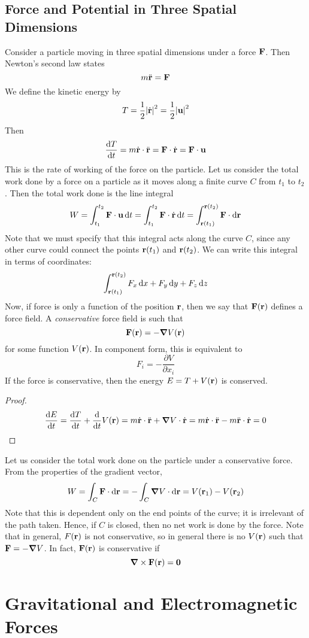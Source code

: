\documentclass{article}
\begin{document}
\subsection{Force and Potential in Three Spatial Dimensions}
Consider a particle moving in three spatial dimensions under a force $\vb F$. Then Newton's second law states
\[ m \ddot {\vb r} = \vb F \]
We define the kinetic energy by
\[ T = \frac{1}{2}\abs{\dot {\vb r}}^2 = \frac{1}{2}\abs{\vb u}^2 \]
Then
\[ \frac{\dd{T}}{\dd{t}} = m \dot {\vb r} \cdot \ddot {\vb r} = \vb F \cdot \dot{\vb r} = \vb F \cdot \vb u \]
This is the rate of working of the force on the particle. Let us consider the total work done by a force on a particle as it moves along a finite curve $C$ from $t_1$ to $t_2$. Then the total work done is the line integral
\[
	W = \int_{t_1}^{t_2} \vb F \cdot \vb u \dd{t}
	= \int_{t_1}^{t_2} \vb F \cdot \dot {\vb r} \dd{t}
	= \int_{\vb r(t_1)}^{\vb r(t_2)} \vb F \cdot \dd \vb r
\]
Note that we must specify that this integral acts along the curve $C$, since any other curve could connect the points $\vb r(t_1)$ and $\vb r(t_2)$. We can write this integral in terms of coordinates:
\[ \int_{\vb r(t_1)}^{\vb r(t_2)} F_x \dd{x} + F_y \dd{y} + F_z \dd{z} \]
Now, if force is only a function of the position $\vb r$, then we say that $\vb F(\vb r)$ defines a force field. A \textit{conservative} force field is such that
\[ \vb F(\vb r) = -\grad V(\vb r) \]
for some function $V(\vb r)$. In component form, this is equivalent to
\[ F_i = -\frac{\partial V}{\partial x_i} \]
If the force is conservative, then the energy $E = T + V(\vb r)$ is conserved.
\begin{proof}
	\[ \frac{\dd{E}}{\dd{t}} = \frac{\dd{T}}{\dd{t}} + \frac{\dd}{\dd{t}}V(\vb r) = m \dot{\vb r} \cdot \ddot{\vb r} + \grad V \cdot \dot{\vb r} = m\dot{\vb r} \cdot \ddot{\vb r} - m\ddot{\vb r} \cdot \dot{\vb r} = 0 \]
\end{proof}
\noindent Let us consider the total work done on the particle under a conservative force. From the properties of the gradient vector,
\[ W = \int_C \vb F \cdot \dd \vb r = -\int_C \grad V \cdot \dd \vb r = V(\vb r_1) - V(\vb r_2) \]
Note that this is dependent only on the end points of the curve; it is irrelevant of the path taken. Hence, if $C$ is closed, then no net work is done by the force. Note that in general, $F(\vb r)$ is not conservative, so in general there is no $V(\vb r)$ such that $\vb F = -\grad V$. In fact, $\vb F(\vb r)$ is conservative if
\[ \grad \times \vb F(\vb r) = \vb 0 \]

\section{Gravitational and Electromagnetic Forces}
\end{document}
